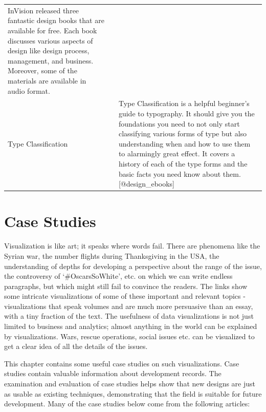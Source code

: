 \documentclass[]{book}
\theoremstyle{definition}
\theoremstyle{definition}
\theoremstyle{definition}
\theoremstyle{remark}
\begin{document}
\begin{longtable}[]{@{}lll@{}}
\begin{minipage}[t]{0.72\columnwidth}
InVision released three fantastic design books that are available for
free. Each book discusses various aspects of design like design process,
management, and business. Moreover, some of the materials are available
in audio format.\strut
\end{minipage}\tabularnewline
\begin{minipage}[t]{0.08\columnwidth}\raggedright\strut
Type Classification\strut
\end{minipage} & \begin{minipage}[t]{0.11\columnwidth}\raggedright\strut
\strut
\end{minipage} & \begin{minipage}[t]{0.72\columnwidth}\raggedright\strut
Type Classification is a helpful beginner's guide to typography. It
should give you the foundations you need to not only start classifying
various forms of type but also understanding when and how to use them to
alarmingly great effect. It covers a history of each of the type forms
and the basic facts you need know about them.{[}@design\_ebooks{]}\strut
\end{minipage}\tabularnewline
\bottomrule
\end{longtable}

\chapter{Case Studies}\label{case-studies}

Visualization is like art; it speaks where words fail. There are
phenomena like the Syrian war, the number flights during Thanksgiving in
the USA, the understanding of depths for developing a perspective about
the range of the issue, the controversy of `\#OscarsSoWhite', etc. on
which we can write endless paragraphs, but which might still fail to
convince the readers. The links show some intricate visualizations of
some of these important and relevant topics - visualizations that speak
volumes and are much more persuasive than an essay, with a tiny fraction
of the text. The usefulness of data visualizations is not just limited
to business and analytics; almost anything in the world can be explained
by visualizations. Wars, rescue operations, social issues etc. can be
visualized to get a clear idea of all the details of the issues.

This chapter contains some useful case studies on such visualizations.
Case studies contain valuable information about development records. The
examination and evaluation of case studies helps show that new designs
are just as usable as existing techniques, demonstrating that the field
is suitable for future development. Many of the case studies below come
from the following articles:
\end{document}
